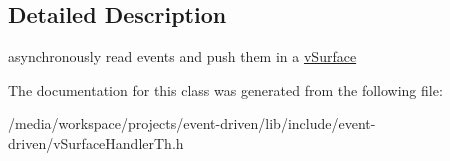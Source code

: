\subsection{Detailed Description}
asynchronously read events and push them in a \hyperlink{classev_1_1vSurface}{v\+Surface} 

The documentation for this class was generated from the following file\+:\begin{DoxyCompactItemize}
\item 
/media/workspace/projects/event-\/driven/lib/include/event-\/driven/v\+Surface\+Handler\+Th.\+h\end{DoxyCompactItemize}
